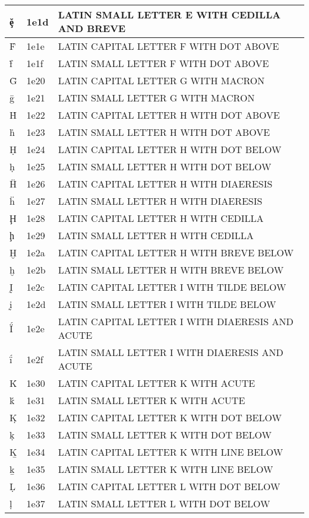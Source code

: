 \documentclass[12pt,letterpaper,openany]{book}
\begin{document}
\begin{center}
\begin{supertabular}{|m{0.25in}|m{0.5in}|m{4in}|}
ḝ & 1e1d & LATIN SMALL LETTER E WITH CEDILLA AND BREVE\\\hline
Ḟ & 1e1e & LATIN CAPITAL LETTER F WITH DOT ABOVE\\\hline
ḟ & 1e1f & LATIN SMALL LETTER F WITH DOT ABOVE\\\hline
Ḡ & 1e20 & LATIN CAPITAL LETTER G WITH MACRON\\\hline
ḡ & 1e21 & LATIN SMALL LETTER G WITH MACRON\\\hline
Ḣ & 1e22 & LATIN CAPITAL LETTER H WITH DOT ABOVE\\\hline
ḣ & 1e23 & LATIN SMALL LETTER H WITH DOT ABOVE\\\hline
Ḥ & 1e24 & LATIN CAPITAL LETTER H WITH DOT BELOW\\\hline
ḥ & 1e25 & LATIN SMALL LETTER H WITH DOT BELOW\\\hline
Ḧ & 1e26 & LATIN CAPITAL LETTER H WITH DIAERESIS\\\hline
ḧ & 1e27 & LATIN SMALL LETTER H WITH DIAERESIS\\\hline
Ḩ & 1e28 & LATIN CAPITAL LETTER H WITH CEDILLA\\\hline
ḩ & 1e29 & LATIN SMALL LETTER H WITH CEDILLA\\\hline
Ḫ & 1e2a & LATIN CAPITAL LETTER H WITH BREVE BELOW\\\hline
ḫ & 1e2b & LATIN SMALL LETTER H WITH BREVE BELOW\\\hline
Ḭ & 1e2c & LATIN CAPITAL LETTER I WITH TILDE BELOW\\\hline
ḭ & 1e2d & LATIN SMALL LETTER I WITH TILDE BELOW\\\hline
Ḯ & 1e2e & LATIN CAPITAL LETTER I WITH DIAERESIS AND ACUTE\\\hline
ḯ & 1e2f & LATIN SMALL LETTER I WITH DIAERESIS AND ACUTE\\\hline
Ḱ & 1e30 & LATIN CAPITAL LETTER K WITH ACUTE\\\hline
ḱ & 1e31 & LATIN SMALL LETTER K WITH ACUTE\\\hline
Ḳ & 1e32 & LATIN CAPITAL LETTER K WITH DOT BELOW\\\hline
ḳ & 1e33 & LATIN SMALL LETTER K WITH DOT BELOW\\\hline
Ḵ & 1e34 & LATIN CAPITAL LETTER K WITH LINE BELOW\\\hline
ḵ & 1e35 & LATIN SMALL LETTER K WITH LINE BELOW\\\hline
Ḷ & 1e36 & LATIN CAPITAL LETTER L WITH DOT BELOW\\\hline
ḷ & 1e37 & LATIN SMALL LETTER L WITH DOT BELOW\\\hline

\end{supertabular}
\end{center}
\end{document}
